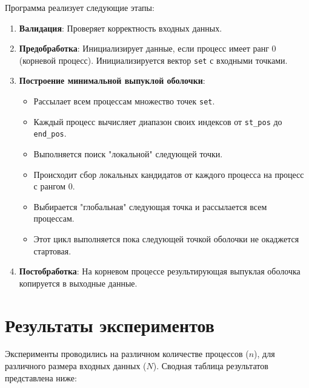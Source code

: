 \documentclass[12pt]{article}
\begin{document}
Программа реализует следующие этапы:
\begin{enumerate}
    \item \textbf{Валидация}: Проверяет корректность входных данных.
    \item \textbf{Предобработка}: Инициализирует данные, если процесс имеет ранг 0 (корневой процесс). Инициализируется вектор \texttt{set} с входными точками.
    \item \textbf{Построение минимальной выпуклой оболочки}: 
    \begin{itemize}
        \item Рассылает всем процессам множество точек \texttt{set}.
        \item Каждый процесс вычисляет диапазон своих индексов от \texttt{st\_pos} до \texttt{end\_pos}.
        \item  Выполняется поиск "локальной" следующей точки.
         \item  Происходит сбор локальных кандидатов от каждого процесса на процесс с рангом 0.
         \item  Выбирается "глобальная" следующая точка и рассылается всем процессам.
        \item Этот цикл выполняется пока следующей точкой оболочки не окаджется стартовая.
    \end{itemize}
    \item \textbf{Постобработка}: На корневом процессе результирующая выпуклая оболочка копируется в выходные данные.
\end{enumerate}

\section{Результаты экспериментов}
Эксперименты проводились на различном количестве процессов ($n$), для различного размера входных данных ($N$). Сводная таблица результатов представлена ниже:
\end{document}

